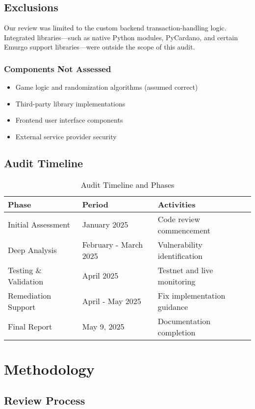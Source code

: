 \documentclass[11pt,a4paper]{report}
\begin{document}
\section{Exclusions}
Our review was limited to the custom backend transaction-handling logic. Integrated libraries—such as native Python modules, PyCardano, and certain Emurgo support libraries—were outside the scope of this audit.

\subsection{Components Not Assessed}
\begin{itemize}
    \item Game logic and randomization algorithms (assumed correct)
    \item Third-party library implementations
    \item Frontend user interface components
    \item External service provider security
\end{itemize}

\section{Audit Timeline}
\begin{table}[h]
\centering
\begin{tabular}{|l|l|l|}
\hline
\rowcolor{lightGray}
\textbf{Phase} & \textbf{Period} & \textbf{Activities} \\
\hline
Initial Assessment & January 2025 & Code review commencement \\
\hline
Deep Analysis & February - March 2025 & Vulnerability identification \\
\hline
Testing \& Validation & April 2025 & Testnet and live monitoring \\
\hline
Remediation Support & April - May 2025 & Fix implementation guidance \\
\hline
Final Report & May 9, 2025 & Documentation completion \\
\hline
\end{tabular}
\caption{Audit Timeline and Phases}
\end{table}

\chapter{Methodology}

\section{Review Process}
\end{document}
